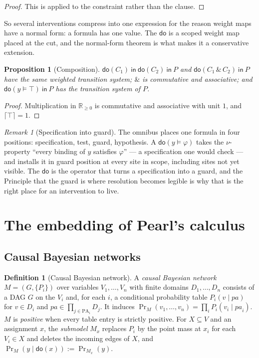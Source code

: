 \documentclass[11pt,a4paper]{article}
\theoremstyle{plain}
\newtheorem{proposition}[theorem]{Proposition}
\theoremstyle{definition}
\newtheorem{definition}[theorem]{Definition}
\theoremstyle{remark}
\newtheorem{remark}[theorem]{Remark}
\newcommand{\Rnn}{\mathbb{R}_{\geq 0}}
\newcommand{\crisp}[1]{\lceil #1 \rceil}
\newcommand{\dok}{\textsf{do}}
\newcommand{\ink}{\textsf{in}}
\newcommand{\PA}{\mathrm{PA}}
\begin{document}
\begin{proof}
This is \cite[Thm.~7.2]{GradedV4} applied to the constraint rather than the
clause.
\end{proof}

So several interventions compress into one expression for the reason weight
maps have a normal form: a formula has one value. The $\dok$ is a scoped weight
map placed at the cut, and the normal-form theorem is what makes it a
conservative extension.

\begin{proposition}[Composition]\label{prop:compose}
$\dok(C_1)\ \ink\ \dok(C_2)\ \ink\ P$ and $\dok(C_1 \,\&\, C_2)\ \ink\ P$ have the
same weighted transition system; $\&$ is commutative and associative; and
$\dok(y \models \top)\ \ink\ P$ has the transition system of $P$.
\end{proposition}

\begin{proof}
Multiplication in $\Rnn$ is commutative and associative with unit $1$, and
$\crisp{\top} = 1$.
\end{proof}

\begin{remark}[Specification into guard]\label{rem:specguard}
The omnibus \cite[Part~III]{Omnibus} places one formula in four positions:
specification, test, guard, hypothesis. A $\dok(y \models \varphi)$ takes the
$\nu$-property ``every binding of $y$ satisfies $\varphi$'' --- a specification
one would check --- and installs it in guard position at every site in scope,
including sites not yet visible. The $\dok$ is the operator that turns a
specification into a guard, and the Principle that the guard is where
resolution becomes legible is why that is the right place for an intervention
to live.
\end{remark}

\section{The embedding of Pearl's calculus}\label{sec:pearl}

\subsection{Causal Bayesian networks}

\begin{definition}[Causal Bayesian network]\label{def:cbn}
A \emph{causal Bayesian network} $M = (G, \{P_i\})$ over variables
$V_1,\dots,V_n$ with finite domains $D_1,\dots,D_n$ consists of a DAG $G$ on the
$V_i$ and, for each $i$, a conditional probability table $P_i(v \mid \mathit{pa})$
for $v \in D_i$ and $\mathit{pa} \in \prod_{j \in \PA_i} D_j$. It induces
$\Pr_M(v_1,\dots,v_n) = \prod_i P_i(v_i \mid \mathit{pa}_i)$. $M$ is
\emph{positive} when every table entry is strictly positive. For $X \subseteq V$
and an assignment $x$, the \emph{submodel} $M_x$ replaces $P_i$ by the point
mass at $x_i$ for each $V_i \in X$ and deletes the incoming edges of $X$, and
$\Pr_M(y \mid \dok(x)) := \Pr_{M_x}(y)$.
\end{definition}
\end{document}
